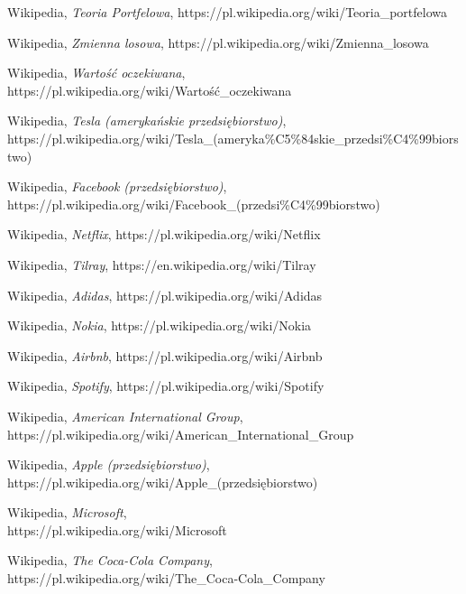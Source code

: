 \documentclass[magister]{dyplom}
\begin{document}
\begin{thebibliography}{30}
	Wikipedia,
	\emph{Teoria Portfelowa},
	https://pl.wikipedia.org/wiki/Teoria\_portfelowa
	
	Wikipedia,
	\emph{Zmienna losowa},
	https://pl.wikipedia.org/wiki/Zmienna\_losowa
	
	Wikipedia,
	\emph{Wartość oczekiwana},
	https://pl.wikipedia.org/wiki/Wartość\_oczekiwana

	Wikipedia,
	\emph{Tesla (amerykańskie przedsiębiorstwo)},\\
	https://pl.wikipedia.org/wiki/Tesla\_(ameryka\%C5\%84skie\_przedsi\%C4\%99biorstwo)
	
	Wikipedia,
	\emph{Facebook (przedsiębiorstwo)},\\
	https://pl.wikipedia.org/wiki/Facebook\_(przedsi\%C4\%99biorstwo)
	
	Wikipedia,
	\emph{Netflix},
	https://pl.wikipedia.org/wiki/Netflix
	
	Wikipedia,
	\emph{Tilray},
	https://en.wikipedia.org/wiki/Tilray
	
	Wikipedia,
	\emph{Adidas},
	https://pl.wikipedia.org/wiki/Adidas
	
	Wikipedia,
	\emph{Nokia},
	https://pl.wikipedia.org/wiki/Nokia
	
	Wikipedia,
	\emph{Airbnb},	
	https://pl.wikipedia.org/wiki/Airbnb
	
	Wikipedia,
	\emph{Spotify},
	https://pl.wikipedia.org/wiki/Spotify
	
	Wikipedia,
	\emph{American International Group},\\
	https://pl.wikipedia.org/wiki/American\_International\_Group
	
	Wikipedia,
	\emph{Apple (przedsiębiorstwo)},\\
	https://pl.wikipedia.org/wiki/Apple\_(przedsiębiorstwo)
	
	Wikipedia,
	\emph{Microsoft},\\
	https://pl.wikipedia.org/wiki/Microsoft
	
	Wikipedia,
	\emph{The Coca-Cola Company},\\
	https://pl.wikipedia.org/wiki/The\_Coca-Cola\_Company	
\end{thebibliography}
\end{document}
